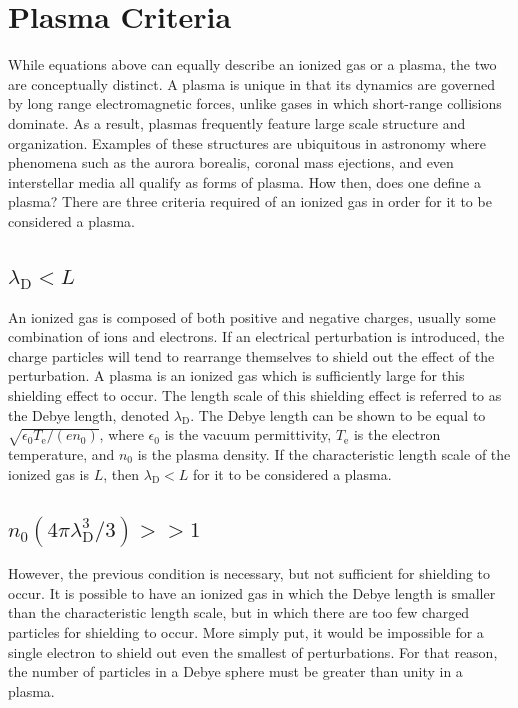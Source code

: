 \section{Plasma Criteria}
While equations above can equally describe an ionized gas or a plasma,
the two are conceptually distinct. A plasma is unique in that its
dynamics are governed by long range electromagnetic forces, unlike gases
in which short-range collisions dominate. As a result, plasmas
frequently feature large scale structure and organization. Examples of
these structures are ubiquitous in astronomy where phenomena such as the
aurora borealis, coronal mass ejections, and even interstellar media all
qualify as forms of plasma. How then, does one define a plasma? There
are three criteria required of an ionized gas in order for it to be
considered a plasma.

\subsection{$\lambda_\mathrm{D} < L$}
An ionized gas is composed of both positive and negative charges,
usually some combination of ions and electrons. If an electrical
perturbation is introduced, the charge particles will tend to rearrange
themselves to shield out the effect of the perturbation. A plasma is an
ionized gas which is sufficiently large for this shielding effect to
occur. The length scale of this shielding effect is referred to as the
Debye length, denoted $\lambda_\mathrm{D}$. The Debye length can be
shown to be equal to $\sqrt{\epsilon_0T_\mathrm{e}/(en_0)}$, where
$\epsilon_0$ is the vacuum permittivity, $T_\mathrm{e}$ is the electron
temperature, and $n_0$ is the plasma density. If the characteristic
length scale of the ionized gas is $L$, then $\lambda_\mathrm{D} < L$
for it to be considered a plasma.

\subsection{$n_0(4\pi \lambda_\mathrm{D}^3/3) >> 1$}
However, the previous condition is necessary, but not sufficient for
shielding to occur. It is possible to have an ionized gas in which the
Debye length is smaller than the characteristic length scale, but in
which there are too few charged particles for shielding to occur. More
simply put, it would be impossible for a single electron to shield out
even the smallest of perturbations. For that reason, the number of
particles in a Debye sphere must be greater than unity in a plasma.

